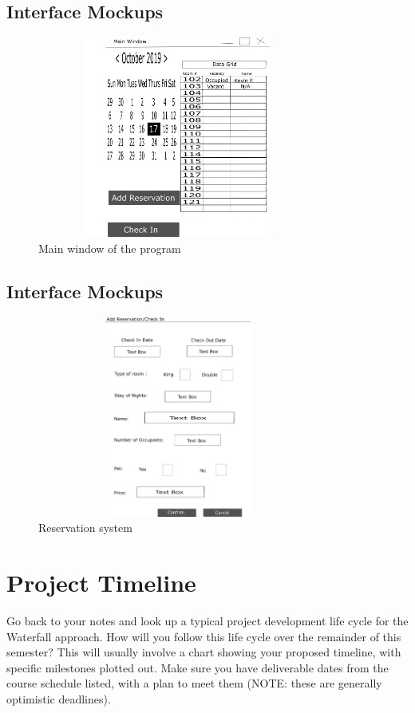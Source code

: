 \documentclass[10pt,conference,onecolumn,compsoc]{IEEEtran}
\begin{document}
\subsection{Interface Mockups}
\begin{figure}[ht!]
\includegraphics[height=250px, width=350px]{MainWindowGUI.png}
\caption{Main window of the program}
\label{Interface}
\end{figure}

\subsection{Interface Mockups}
\begin{figure}[ht!]
\includegraphics[height=250px, width=350px]{ResrvationGUI.png}
\caption{Reservation system}
\label{Interface}
\end{figure}


\section{Project Timeline}
Go back to your notes and look up a typical project development life cycle for the Waterfall approach.  How will you follow this life cycle over the remainder of this semester?  This will usually involve a chart showing your proposed timeline, with specific milestones plotted out.  Make sure you have deliverable dates from the course schedule listed, with a plan to meet them (NOTE: these are generally optimistic deadlines).
\end{document}
